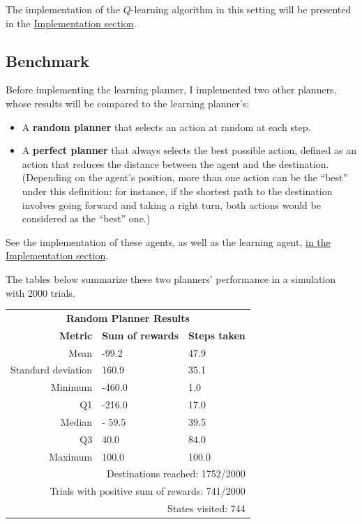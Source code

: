 \documentclass{article}
\begin{document}
The implementation of the $Q$-learning algorithm in this setting will be presented in the \hyperref[sec:implementation]{Implementation section}.

\subsection{Benchmark}
\label{sec:benchmark}
Before implementing the learning planner, I implemented two other planners, whose results will be compared to the learning planner's:

\begin{itemize}
    \item A \textbf{random planner} that selects an action at random at each step.
    \item A \textbf{perfect planner}  that always selects the best possible action, defined as an action that reduces the distance between the agent and the destination. (Depending on the agent's position, more than one action can be the ``best'' under this definition: for instance, if the shortest path to the destination involves going forward and taking a right turn, both actions would be considered as the ``best'' one.)
\end{itemize}

See the implementation of these agents, as well as the learning agent, \hyperref[sec:implementation]{in the Implementation section}.

The tables below summarize these two planners' performance in a simulation with 2000 trials.

\renewcommand{\arraystretch}{1.25}

\begin{center}
   \begin{tabular}{rll}
        \multicolumn{3}{c}{\textbf{Random Planner Results}} \\
        \textbf{Metric}    & \textbf{Sum of rewards}    &\textbf{Steps taken}\\
        Mean               & -99.2                      & 47.9\\
        Standard deviation & 160.9                      & 35.1\\
        Minimum            & -460.0                     & 1.0\\
        Q1                 & -216.0                     & 17.0\\
        Median             & - 59.5                     & 39.5\\
        Q3                 & 40.0                       & 84.0\\
        Maximum            & 100.0                      & 100.0\\
        \multicolumn{3}{r}{Destinations reached: 1752/2000}\\
        \multicolumn{3}{r}{Trials with positive sum of rewards: 741/2000}\\
        \multicolumn{3}{r}{States visited: 744}\\
    \end{tabular}
\end{center}
\end{document}
